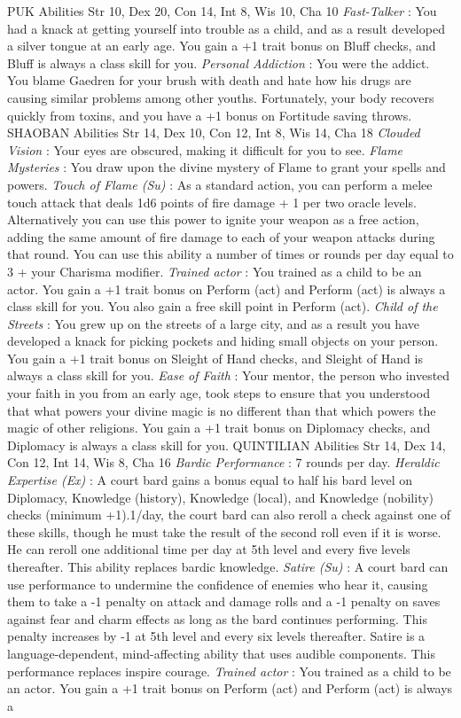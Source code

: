 PUK           Abilities Str 10, Dex 20, Con 14, Int 8, Wis 10, Cha 10    {\itshape Fast-Talker} : You had a knack at getting yourself into trouble as a child, and as a result developed a silver tongue at an early age. You gain a +1 trait bonus on Bluff checks, and Bluff is always a class skill for you.   {\itshape Personal Addiction} : You were the addict. You blame Gaedren for your brush with death and hate how his drugs are causing similar problems among other youths. Fortunately, your body recovers quickly from toxins, and you have a +1 bonus on Fortitude saving throws. SHAOBAN            Abilities Str 14, Dex 10, Con 12, Int 8, Wis 14, Cha 18    {\itshape Clouded Vision} : Your eyes are obscured, making it difficult for you to see.   {\itshape Flame Mysteries} : You draw upon the divine mystery of Flame to grant your spells and powers.   {\itshape Touch of Flame (Su)} : As a standard action, you can perform a melee touch attack that deals 1d6 points of fire damage + 1 per two oracle levels. Alternatively you can use this power to ignite your weapon as a free action, adding the same amount of fire damage to each of your weapon attacks during that round. You can use this ability a number of times or rounds per day equal to 3 + your Charisma modifier.    {\itshape Trained actor} : You trained as a child to be an actor. You gain a +1 trait bonus on Perform (act) and Perform (act) is always a class skill for you. You also gain a free skill point in Perform (act).   {\itshape Child of the Streets} : You grew up on the streets of a large city, and as a result you have developed a knack for picking pockets and hiding small objects on your person. You gain a +1 trait bonus on Sleight of Hand checks, and Sleight of Hand is always a class skill for you.   {\itshape Ease of Faith} : Your mentor, the person who invested your faith in you from an early age, took steps to ensure that you understood that what powers your divine magic is no different than that which powers the magic of other religions. You gain a +1 trait bonus on Diplomacy checks, and Diplomacy is always a class skill for you. QUINTILIAN            Abilities Str 14, Dex 14, Con 12, Int 14, Wis 8, Cha 16    {\itshape Bardic Performance} : 7 rounds per day.   {\itshape Heraldic Expertise (Ex)} : A court bard gains a bonus equal to half his bard level on Diplomacy, Knowledge (history), Knowledge (local), and Knowledge (nobility) checks (minimum +1).1/day, the court bard can also reroll a check against one of these skills, though he must take the result of the second roll even if it is worse. He can reroll one additional time per day at 5th level and every five levels thereafter. This ability replaces bardic knowledge.   {\itshape Satire (Su)} : A court bard can use performance to undermine the confidence of enemies who hear it, causing them to take a -1 penalty on attack and damage rolls and a -1 penalty on saves against fear and charm effects as long as the bard continues performing. This penalty increases by -1 at 5th level and every six levels thereafter. Satire is a language-dependent, mind-affecting ability that uses audible components. This performance replaces inspire courage.   {\itshape Trained actor} : You trained as a child to be an actor. You gain a +1 trait bonus on Perform (act) and Perform (act) is always a 